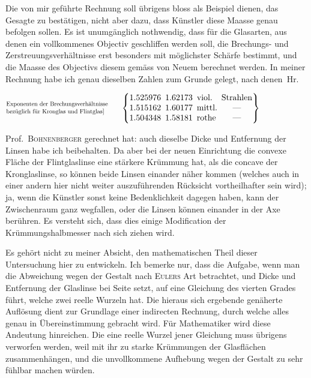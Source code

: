 Die von mir geführte Rechnung soll übrigens bloss als Beispiel dienen, das Gesagte zu bestätigen, nicht aber dazu, dass Künstler diese Maasse genau befolgen sollen. Es ist unumgänglich nothwendig, dass für die Glasarten, aus denen ein vollkommenes Objectiv geschliffen werden soll, die Brechungs- und Zerstreuungsverhältnisse erst besonders mit möglichster Schärfe bestimmt, und die Maasse des Objectivs diesem gemäss von Neuem berechnet werden. In meiner Rechnung habe ich genau dieselben Zahlen zum Grunde gelegt, nach denen~Hr.
\par\clearpage
{}
\expandafter\def\csname HistoricalNoteText513\endcsname{%
  \resizebox{.91\linewidth}{!}{[Dicke der ersten Linse $=200$, der zweiten $=80$ Abstand zwischen beiden Linsen $=50$.}\par
  \noindent\(
    \vcenter{\hbox{\makebox[.396\linewidth][l]{%
      \resizebox{.352\linewidth}{!}{\shortstack[l]{Exponenten der Brechungsverhältnisse\\
      bezüglich für Kronglas und Flintglas]}}}}}
    \left\{\begin{array}{@{}l@{\enspace}l@{\enspace}l@{\enspace}c@{}}
      1.525976&1.62173&\text{viol.}&\text{Strahlen}\\
      1.515162&1.60177&\text{mittl.}&\text{—}\\
      1.504348&1.58181&\text{rothe}&\text{—}
    \end{array}\right\}
  \)%
}
\noindent Prof.\ \textsc{Bohnenberger} gerechnet hat: auch dieselbe Dicke und Entfernung der Linsen habe ich beibehalten. Da aber bei der neuen Einrichtung die convexe Fläche der Flintglaslinse eine stärkere Krümmung hat, als die concave der Kronglaslinse, so können beide Linsen einander näher kommen (welches auch in einer andern hier nicht weiter auszuführenden Rücksicht vortheilhafter sein wird); ja, wenn die Künstler sonst keine Bedenklichkeit dagegen haben, kann der Zwischenraum ganz wegfallen, oder die Linsen können einander in der Axe berühren. Es versteht sich, dass dies einige Modification der Krümmungshalbmesser nach sich ziehen wird.

Es gehört nicht zu meiner Absicht, den mathematischen Theil dieser Untersuchung hier zu entwickeln. Ich bemerke nur, dass die Aufgabe, wenn man die Abweichung wegen der Gestalt nach \textsc{Eulers} Art betrachtet, und Dicke und Entfernung der Glaslinse bei Seite setzt, auf eine Gleichung des vierten Grades führt, welche zwei reelle Wurzeln hat. Die hieraus sich ergebende genäherte Auflösung dient zur Grundlage einer indirecten Rechnung, durch welche alles genau in Übereinstimmung gebracht wird. Für Mathematiker wird diese Andeutung hinreichen. Die eine reelle Wurzel jener Gleichung muss übrigens verworfen werden, weil mit ihr zu starke Krümmungen der Glasflächen zusammenhängen, und die unvollkommene Aufhebung wegen der Gestalt zu sehr fühlbar machen würden.

